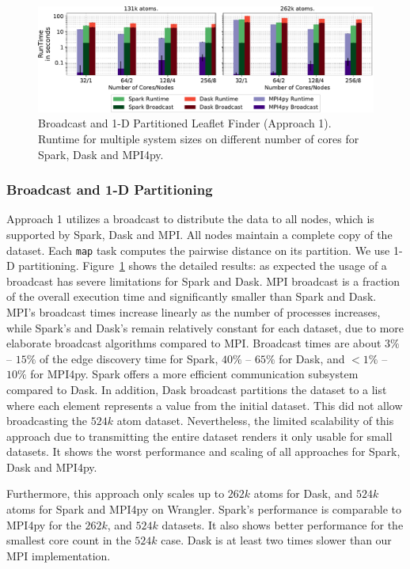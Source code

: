 \begin{figure}[t]
    \centering
    \includegraphics[width=.95\textwidth]{figures/data_analytics_hpc/task_par/spark_dask_lf_approach1.pdf}
    \caption{Broadcast and 1-D Partitioned Leaflet Finder (Approach 1).
    Runtime for multiple system sizes on different number of cores for Spark, Dask and MPI4py.}
    \label{fig:WranglerLeafLetFinderApp1}
\end{figure}

\subsubsection*{Broadcast and 1-D Partitioning}
Approach 1 utilizes a broadcast to distribute the data to all nodes, which is supported by Spark, Dask and MPI.
All nodes maintain a complete copy of the dataset.
Each \texttt{map} task computes the pairwise distance on its partition.
We use 1-D partitioning.
Figure~\ref{fig:WranglerLeafLetFinderApp1} shows the detailed results: as expected the usage of a broadcast has severe limitations for Spark and Dask.
MPI broadcast is a fraction of the overall execution time and significantly smaller than Spark and Dask.
MPI's broadcast times increase linearly as the number of processes increases, while Spark's and Dask's remain relatively constant for each dataset, due to more elaborate broadcast algorithms compared to MPI.
Broadcast times are about $3\%$ -- $15\%$ of the edge discovery time for Spark, $40\%$ -- $65\%$ for Dask, and $<1\%$ -- $10\%$ for MPI4py.
Spark offers a more efficient communication subsystem compared to Dask.
In addition, Dask broadcast partitions the dataset to a list where each element represents a value from the initial dataset.
This did not allow broadcasting the $524k$ atom dataset.
Nevertheless, the limited scalability of this approach due to transmitting the entire dataset renders it only usable for small datasets.
It shows the worst performance and scaling of all approaches for Spark, Dask and MPI4py.

Furthermore, this approach only scales up to $262k$ atoms for Dask, and $524k$ atoms for Spark and MPI4py on Wrangler.
Spark's performance is comparable to MPI4py for the $262k$, and $524k$ datasets.
It also shows better performance for the smallest core count in the $524k$ case.
Dask is at least two times slower than our MPI implementation.

